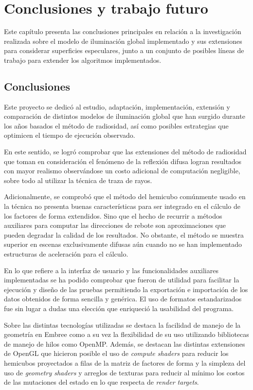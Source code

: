 \chapter{Conclusiones y trabajo futuro}
\label{ch:chap06}

Este capítulo presenta las conclusiones principales en relación a la investigación realizada sobre el modelo de iluminación global implementado y sus extensiones para considerar superficies especulares, junto a un conjunto de posibles líneas de trabajo para extender los algoritmos implementados.

\section{Conclusiones}
\label{sec:conclusiones}

Este proyecto se dedicó al estudio, adaptación, implementación, extensión y comparación de distintos modelos de iluminación global que han surgido durante los años basados el método de radiosidad, así como posibles estrategias que optimicen el tiempo de ejecución observado.

En este sentido, se logró comprobar que las extensiones del método de radiosidad que toman en consideración el fenómeno de la reflexión difusa logran resultados con mayor realismo observándose un costo adicional de computación negligible, sobre todo al utilizar la técnica de traza de rayos.

Adicionalmente, se comprobó que el método del hemicubo comúnmente usado en la técnica no presenta buenas características para ser integrado en el cálculo de los factores de forma extendidos. Sino que el hecho de recurrir a métodos auxiliares para computar las direcciones de rebote son aproximaciones que pueden degradar la calidad de los resultados. No obstante, el método se muestra superior en escenas exclusivamente difusas aún cuando no se han implementado estructuras de aceleración para el cálculo.

En lo que refiere a la interfaz de usuario y las funcionalidades auxiliares implementadas se ha podido comprobar que fueron de utilidad para facilitar la ejecución y diseño de las pruebas permitiendo la exportación e importación de los datos obtenidos de forma sencilla y genérica. El uso de formatos estandarizados fue sin lugar a dudas una elección que enriqueció la usabilidad del programa.

Sobre las distintas tecnologías utilizadas se destaca la facilidad de manejo de la geometría en Embree como a su vez la flexibilidad de su uso utilizando bibliotecas de manejo de hilos como OpenMP. Además, se destacan las distintas extensiones de OpenGL que hicieron posible el uso de \textit{compute shaders} para reducir los hemicubos proyectados a filas de la matriz de factores de forma y la simpleza del uso de \textit{geometry shaders} y arreglos de texturas para reducir al mínimo los costos de las mutaciones del estado en lo que respecta de \textit{render targets}.

